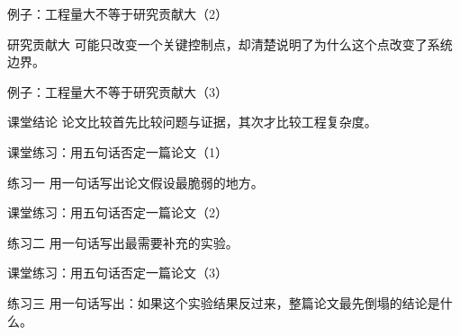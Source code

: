 \begin{frame}{例子：工程量大不等于研究贡献大（2）}
\begin{block}{研究贡献大}
    可能只改变一个关键控制点，却清楚说明了为什么这个点改变了系统边界。
  \end{block}
\end{frame}

\begin{frame}{例子：工程量大不等于研究贡献大（3）}
\begin{block}{课堂结论}
    论文比较首先比较问题与证据，其次才比较工程复杂度。
  \end{block}
\end{frame}

\begin{frame}{课堂练习：用五句话否定一篇论文（1）}
\begin{block}{练习一}
    用一句话写出论文假设最脆弱的地方。
  \end{block}
\end{frame}

\begin{frame}{课堂练习：用五句话否定一篇论文（2）}
\begin{block}{练习二}
    用一句话写出最需要补充的实验。
  \end{block}
\end{frame}

\begin{frame}{课堂练习：用五句话否定一篇论文（3）}
\begin{block}{练习三}
    用一句话写出：如果这个实验结果反过来，整篇论文最先倒塌的结论是什么。
  \end{block}
\end{frame}
